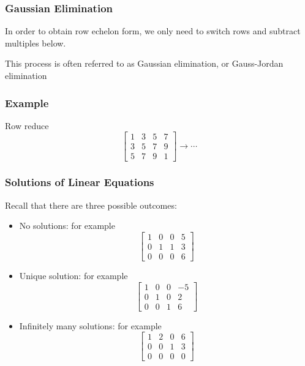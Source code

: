   \begin{frame}[fragile]\frametitle{Gaussian Elimination}

In order to obtain row echelon form, we only need to switch rows and subtract 
multiples below.

This process is often referred to as Gaussian elimination, or 
Gauss-Jordan elimination

\end{frame}


  \begin{frame}[fragile]\frametitle{Example}

 Row reduce 
 \begin{equation*}
   \begin{bmatrix}
   1& 3 & 5 & 7 \\
   3 & 5 & 7 & 9 \\
   5& 7 & 9 & 1
  \end{bmatrix}
  \rightarrow  \cdots
 \end{equation*}

\end{frame}

  \begin{frame}[fragile]\frametitle{Solutions of Linear Equations}
Recall that there are three possible outcomes:  
\begin{itemize}
 \item No solutions: for example
 \[
  \begin{bmatrix}
   1 & 0 & 0 & 5 \\
   0 & 1 & 1 & 3 \\
   0 & 0 & 0 & 6
  \end{bmatrix}
 \]


\item Unique solution: for example
\[
  \left[\begin{array}{rrrr}
   1 & 0 & 0 & -5 \\
   0 & 1 & 0 & 2 \\
   0 & 0 & 1 & 6
  \end{array}\right]
 \]
 
 \item Infinitely many solutions: for example
 \[
  \begin{bmatrix}
   1 & 2 & 0 & 6 \\
   0 & 0 & 1 & 3 \\
   0 & 0 & 0 & 0
  \end{bmatrix}
 \]
 \end{itemize}
 \end{frame}
 
